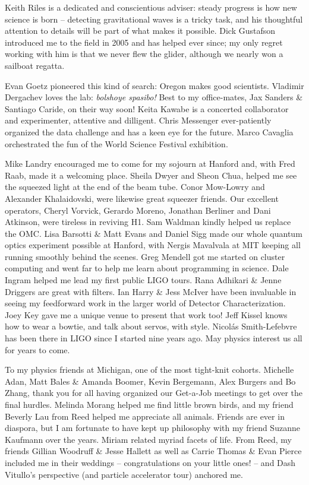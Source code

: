\documentclass[leqno,twoside]{report}
\theoremstyle{plain}
\theoremstyle{definition}
\theoremstyle{remark}
\numberwithin{theorem}{chapter}        %
\begin{document}
Keith Riles is a dedicated and conscientious adviser: steady progress is how new science is born -- detecting gravitational waves is a tricky task, and his thoughtful attention to details will be part of what makes it possible.
Dick Gustafson introduced me to the field in 2005 and has helped ever since; my only regret working with him is that we never flew the glider, although we nearly won a sailboat regatta.

Evan Goetz pioneered this kind of search: Oregon makes good scientists.
Vladimir Dergachev loves the lab: \textit{bolshoye spasibo!}
Best to my office-mates, Jax Sanders \& Santiago Caride, on their way soon!
Keita Kawabe is a concerted collaborator and experimenter, attentive and dilligent.
Chris Messenger ever-patiently organized the data challenge and has a keen eye for the future.
Marco Cavaglia orchestrated the fun of the World Science Festival exhibition.

Mike Landry encouraged me to come for my sojourn at Hanford and, with Fred Raab, made it a welcoming place.
Sheila Dwyer and Sheon Chua, helped me see the squeezed light at the end of the beam tube.
Conor Mow-Lowry and Alexander Khalaidovski, were likewise great squeezer friends. 
Our excellent operators, Cheryl Vorvick, Gerardo Moreno, Jonathan Berliner and Dani Atkinson, were tireless in reviving H1.
Sam Waldman kindly helped us replace the OMC.
Lisa Barsotti \& Matt Evans and Daniel Sigg made our whole quantum optics experiment possible at Hanford, with Nergis Mavalvala at MIT keeping all running smoothly behind the scenes.
Greg Mendell got me started on cluster computing and went far to help me learn about programming in science.
Dale Ingram helped me lead my first public LIGO tours.
Rana Adhikari \& Jenne Driggers are great with filters.
Ian Harry \& Jess McIver have been invaluable in seeing my feedforward work in the larger world of Detector Characterization.
Joey Key gave me a unique venue to present that work too!
Jeff Kissel knows how to wear a bowtie, and talk about servos, with style.
Nicol\'{a}s Smith-Lefebvre has been there in LIGO since I started nine years ago.
May physics interest us all for years to come.

To my physics friends at Michigan, one of the most tight-knit cohorts.
Michelle Adan, Matt Bales \& Amanda Boomer, Kevin Bergemann, Alex Burgers and Bo Zhang, thank you for all having organized our Get-a-Job meetings to get over the final hurdles.
Melinda Morang helped me find little brown birds, and my friend Beverly Lau from Reed helped me appreciate all animals.
Friends are ever in diaspora, but I am fortunate to have kept up philosophy with my friend Suzanne Kaufmann over the years.
Miriam related myriad facets of life.
From Reed, my friends Gillian Woodruff \& Jesse Hallett as well as Carrie Thomas \& Evan Pierce included me in their weddings -- congratulations on your little ones! -- and Dash Vitullo's perspective (and particle accelerator tour) anchored me.
\end{document}

